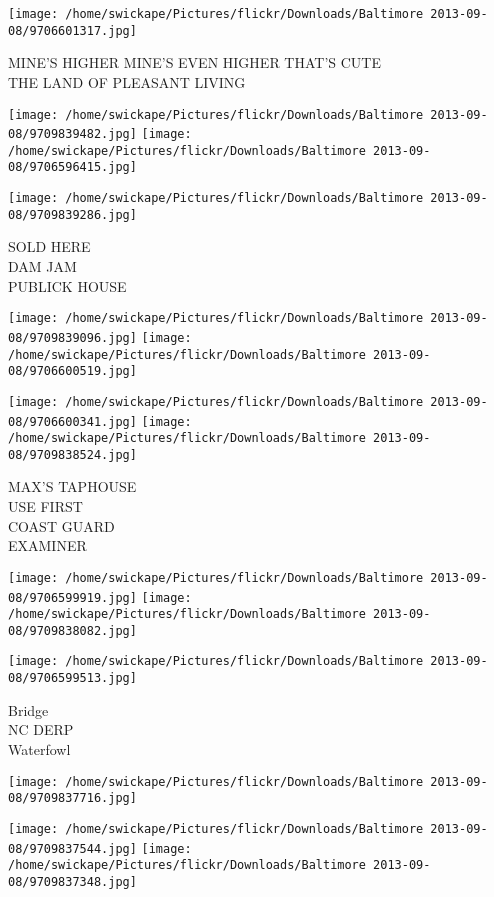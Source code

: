 \documentclass[10pt,letterpaper]{article}
\begin{document}
\vspace{0.25in}
\texttt{[image: /home/swickape/Pictures/flickr/Downloads/Baltimore 2013-09-08/9706601317.jpg]}

MINE'S HIGHER MINE'S EVEN HIGHER THAT'S CUTE\\
THE LAND OF PLEASANT LIVING
\pagebreak

\texttt{[image: /home/swickape/Pictures/flickr/Downloads/Baltimore 2013-09-08/9709839482.jpg]}
\texttt{[image: /home/swickape/Pictures/flickr/Downloads/Baltimore 2013-09-08/9706596415.jpg]}

\vspace{0.25in}
\texttt{[image: /home/swickape/Pictures/flickr/Downloads/Baltimore 2013-09-08/9709839286.jpg]}

SOLD HERE\\
DAM JAM\\
PUBLICK HOUSE
\pagebreak

\texttt{[image: /home/swickape/Pictures/flickr/Downloads/Baltimore 2013-09-08/9709839096.jpg]}
\texttt{[image: /home/swickape/Pictures/flickr/Downloads/Baltimore 2013-09-08/9706600519.jpg]}

\texttt{[image: /home/swickape/Pictures/flickr/Downloads/Baltimore 2013-09-08/9706600341.jpg]}
\texttt{[image: /home/swickape/Pictures/flickr/Downloads/Baltimore 2013-09-08/9709838524.jpg]}

MAX'S TAPHOUSE\\
USE FIRST\\
COAST GUARD\\
EXAMINER
\pagebreak

\texttt{[image: /home/swickape/Pictures/flickr/Downloads/Baltimore 2013-09-08/9706599919.jpg]}
\texttt{[image: /home/swickape/Pictures/flickr/Downloads/Baltimore 2013-09-08/9709838082.jpg]}

\texttt{[image: /home/swickape/Pictures/flickr/Downloads/Baltimore 2013-09-08/9706599513.jpg]}

Bridge\\
NC DERP\\
Waterfowl
\pagebreak

\texttt{[image: /home/swickape/Pictures/flickr/Downloads/Baltimore 2013-09-08/9709837716.jpg]}

\vspace{0.25in}
\texttt{[image: /home/swickape/Pictures/flickr/Downloads/Baltimore 2013-09-08/9709837544.jpg]}
\texttt{[image: /home/swickape/Pictures/flickr/Downloads/Baltimore 2013-09-08/9709837348.jpg]}
\end{document}
